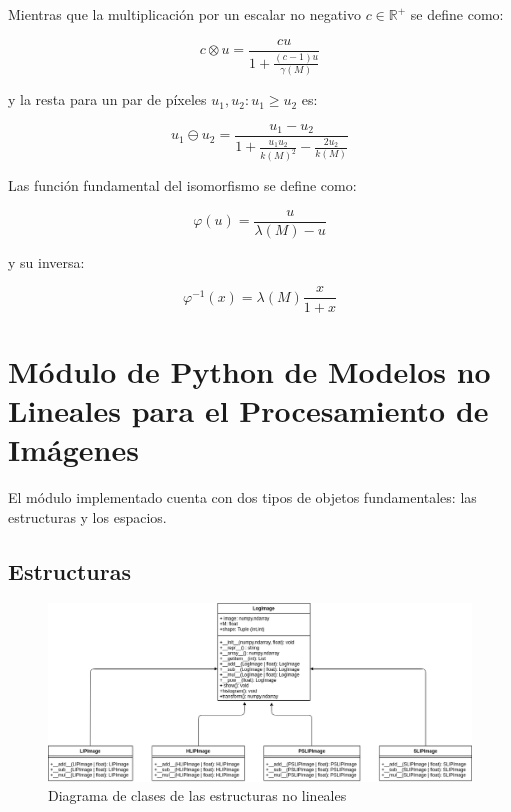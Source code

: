 Mientras que la multiplicaci\'on por un escalar no negativo $c\in\mathbb{R}^+$ se define como:

\begin{equation}
	c\otimes u=\frac{cu}{1+\frac{(c-1)u}{\gamma(M)}}
\end{equation}

y la resta para un par de p\'ixeles $u_1,u_2:u_1\geq u_2$ es:

\begin{equation}
	u_1\ominus u_2=\frac{u_1-u_2}{1+\frac{u_1u_2}{k(M)^2}-\frac{2u_2}{k(M)}}
\end{equation}

Las funci\'on fundamental del isomorfismo se define como:

\begin{equation}
	\varphi(u)=\frac{u}{\lambda(M)-u}
\end{equation}

y su inversa:

\begin{equation}
	\varphi^{-1}(x)=\lambda(M)\frac{x}{1+x}
\end{equation}

\section{M\'odulo de Python de Modelos no Lineales para el Procesamiento de Im\'agenes}

El m\'odulo implementado cuenta con dos tipos de objetos fundamentales: las estructuras y los espacios.

\subsection{Estructuras}

\begin{figure}
	\begin{center}
		\includegraphics[width=16.0 cm]{images/structures_class_diagram.png}
		\caption{Diagrama de clases de las estructuras no lineales}
	\end{center}
\end{figure}

